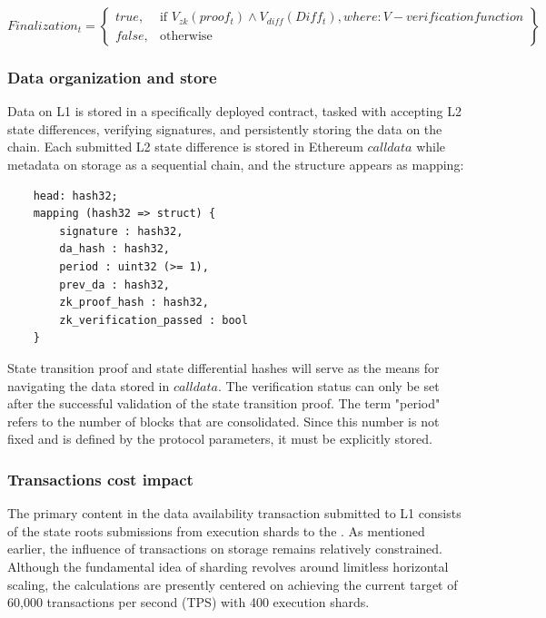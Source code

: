 \[
    Finalization_t =
    \left\{
    \begin{array}{lr}
    true, & \text{if } V_{zk}(proof_t) \wedge V_{diff}(Diff_t), where: V - verification function\\
    false, & \text{otherwise}
    \end{array}
    \right\}
\]
    

\subsubsection{Data organization and store}

Data on L1 is stored in a specifically deployed contract, tasked with accepting L2 state differences, 
verifying signatures, and persistently storing the data on the chain. Each submitted L2 \mainshard 
state difference is stored in Ethereum $calldata$ while metadata on storage as a sequential chain, and 
the structure appears as mapping:

\begin{verbatim}
    head: hash32;
    mapping (hash32 => struct) {
        signature : hash32,
        da_hash : hash32, 
        period : uint32 (>= 1),
        prev_da : hash32,
        zk_proof_hash : hash32,
        zk_verification_passed : bool
    }
\end{verbatim}


State transition proof and state differential hashes will serve as the means for navigating the data stored 
in $calldata$. 
The verification status can only be set after the successful validation of the state 
transition proof. 
The term "period" refers to the number of blocks that are consolidated. Since this 
number is not fixed and is defined by the protocol parameters, it must be explicitly stored.

\subsubsection{Transactions cost impact}

The primary content in the data availability transaction submitted to L1 consists of the state 
roots submissions from execution shards to the \mainshard. 
As mentioned earlier, the influence 
of transactions on \mainshard storage remains relatively constrained. 
Although the fundamental 
idea of sharding revolves around limitless horizontal scaling, the calculations are presently 
centered on achieving the current target of 60,000 transactions per second (TPS) with 400 execution shards. 

